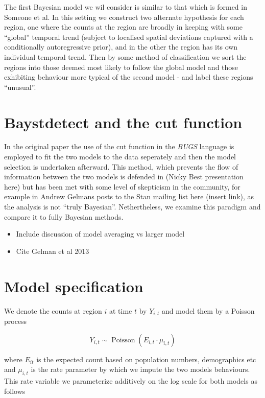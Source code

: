 \documentclass[11pt]{report}
\begin{document}
The first Bayesian model we wil consider is similar to that which is formed in Someone et al. In this setting we construct two alternate hypothesis for each region, one where the counts at the region are broadly in keeping with some ``global'' temporal trend (subject to localised spatial deviations captured with a conditionally autoregressive prior), and in the other the region has its own individual temporal trend. Then by some method of classification we sort the regions into those deemed most likely to follow the global model and those exhibiting behaviour more typical of the second model - and label these regions ``unusual''.

\section{Baystdetect and the cut function}

In the original paper \citet{baystdetect} the use of the cut function in the \emph{BUGS} language is employed to fit the two models to the data seperately and then the model selection is undertaken afterward. This method, which prevents the flow of information between the two models is defended in (Nicky Best presentation here) but has been met with some level of skepticism in the community, for example in Andrew Gelmans posts to the Stan mailing list here (insert link), as the analysis is not ``truly Bayesian''. Nethertheless, we examine this paradigm and compare it to fully Bayesian methods. 

\begin{itemize}
\item Include discussion of model averaging vs larger model
\item Cite Gelman et al 2013
\end{itemize}

\section{Model specification}

We denote the counts at region $i$ at time $t$ by $Y_{i,t}$ and model them by a Poisson process

\begin{equation}
Y_{i,t} \sim \operatorname{Poisson}(E_{i,t} \cdot \mu_{i,t})
\end{equation}

where $E_{it}$ is the expected count based on population numbers, demographics etc and $\mu_{i,t}$ is the rate parameter by which we impute the two models behaviours. This rate variable we parameterize additively on the log scale for both models as follows
\end{document}
